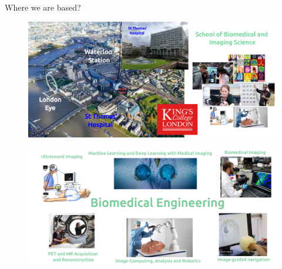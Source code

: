 
{
\begin{frame}{Where we are based?}

  \begin{figure}
  \centering
  \includegraphics[width=1.0\textwidth]{./../figures/where-we-are-based/versions/drawing-v04.png}
  \end{figure}

\end{frame}
}




{
\begin{frame}{}

  \begin{figure}
  \centering
  \includegraphics[width=1.0\textwidth]{./../figures/biomedical-engineer/versions/drawing-v04}
  \end{figure}

\end{frame}
}


